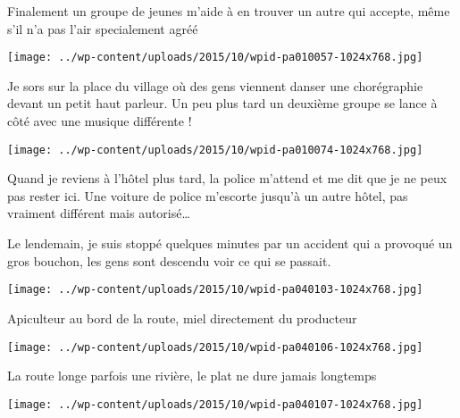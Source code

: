  Finalement un groupe de jeunes m'aide à en trouver un autre qui accepte, même s'il n'a pas l'air specialement agréé 

 

\begin{center} \texttt{[image: ../wp-content/uploads/2015/10/wpid-pa010057-1024x768.jpg]} \end{center}

 

 Je sors sur la place du village où des gens viennent danser une chorégraphie devant un petit haut parleur. Un peu plus tard un deuxième groupe se lance à côté avec une musique différente ! 

 

\begin{center} \texttt{[image: ../wp-content/uploads/2015/10/wpid-pa010074-1024x768.jpg]} \end{center}

 

 Quand je reviens à l'hôtel plus tard, la police m'attend et me dit que je ne peux pas rester ici. Une voiture de police m'escorte jusqu'à un autre hôtel, pas vraiment différent mais autorisé…

 Le lendemain, je suis stoppé quelques minutes par un accident qui a provoqué un gros bouchon, les gens sont descendu voir ce qui se passait. 

 

\begin{center} \texttt{[image: ../wp-content/uploads/2015/10/wpid-pa040103-1024x768.jpg]} \end{center}

 

 Apiculteur au bord de la route, miel directement du producteur 

 

\begin{center} \texttt{[image: ../wp-content/uploads/2015/10/wpid-pa040106-1024x768.jpg]} \end{center}

 

 La route longe parfois une rivière, le plat ne dure jamais longtemps 

 

\begin{center} \texttt{[image: ../wp-content/uploads/2015/10/wpid-pa040107-1024x768.jpg]} \end{center}

